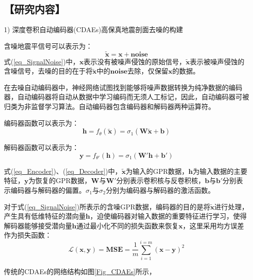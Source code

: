 \documentclass[11pt]{article}
\newcommand{\kai}{\CJKfamily{kai}}
\begin{document}
\subsection*{\kai\fontsize{11pt}{10pt} \selectfont【研究内容】}
1) 深度卷积自动编码器(CDAEs)高保真地震剖面去噪的构建
\par
含噪地震平信号可以表示为：
\begin{equation}\label{eq_SignalNoise}
\boldsymbol{\tilde{x}}=\boldsymbol{x}+\boldsymbol{noise}
\end{equation}
式(\ref{eq_SignalNoise})中，$\boldsymbol{x}$表示没有被噪声侵蚀的原始信号，$\boldsymbol{\tilde{x}}$表示被噪声侵蚀的含噪信号，去噪的目的在于将$\boldsymbol{\tilde{x}}$中的$\boldsymbol{noise}$去除，仅保留$\boldsymbol{x}$的数据。
\par
在去噪自动编码器中，神经网络试图找到能够将噪声数据转换为纯净数据的编码器，自动编码器将自动从数据中学习编码而无须人工标记，因此，自动编码器可被归类为非监督学习算法。自动编码器包含编码器和解码器两种运算符。
\par
编码器函数可以表示为：
\begin{equation}\label{eq_Encoder}
\boldsymbol{h}=f_{\theta}(\boldsymbol{\tilde{x}})=\sigma_1(\boldsymbol{W\tilde{x}+b})
\end{equation}
\par
解码器函数可以表示为：
\begin{equation}\label{eq_Decoder}
\boldsymbol{y}=f_{\theta'}(\boldsymbol{h})=\sigma_1(\boldsymbol{W'h+b'})
\end{equation}
\par
式(\ref{eq_Encoder})、(\ref{eq_Decoder})中，$\boldsymbol{\tilde{x}}$为输入的GPR数据，$\boldsymbol{h}$为输入数据的主要特征，$\boldsymbol{y}$为恢复的GPR数据，$\boldsymbol{W}$与$\boldsymbol{W'}$分别表示卷积核与反卷积核，$\boldsymbol{b}$与$\boldsymbol{b'}$分别表示编码器与解码器的偏置。$\sigma_1$与$\sigma_2$分别为编码器与解码器的激活函数。
\par
对于式(\ref{eq_SignalNoise})所表示的含噪GPR数据，编码器的目的是将$\boldsymbol{\tilde{x}}$进行处理，产生具有低维特征的潜向量$\boldsymbol{h}$，迫使编码器对输入数据的重要特征进行学习，使得解码器能够接受潜向量$\boldsymbol{h}$通过最小化不同的损失函数来恢复$\boldsymbol{x}$，这里采用均方误差作为损失函数：
\begin{equation}\label{eq_LossFunction}
\mathcal{L}(\boldsymbol{x},\boldsymbol{y})=\boldsymbol{MSE}=\frac{1}{m}\sum_{i=1}^{i=m}(\boldsymbol{x}-\boldsymbol{y})^2
\end{equation}
\par
传统的CDAEs的网络结构如图\ref{Fig_CDAEs}所示，
\end{document}
